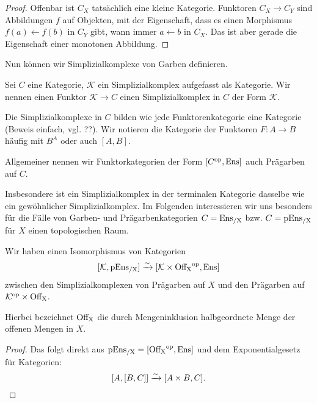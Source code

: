 \begin{proof}
  Offenbar ist $C_X$ tatsächlich eine kleine Kategorie. Funktoren $C_X
  \to C_Y$ sind Abbildungen $f$ auf Objekten, mit der Eigenschaft,
  dass es einen Morphismus $f(a) \leftarrow f(b)$ in $C_Y$ gibt, wann
  immer $a \leftarrow b$ in $C_X$. Das ist aber gerade die Eigenschaft
  einer monotonen Abbildung.
\end{proof}

Nun können wir Simplizialkomplexe von Garben definieren.

\begin{defn}
  Sei $C$ eine Kategorie, $\mathcal{K}$ ein Simplizialkomplex
  aufgefasst als Kategorie. Wir nennen einen Funktor $\mathcal{K} \to
  C$ einen Simplizialkomplex in $C$ der Form $\mathcal{K}$.
\end{defn}

Die Simplizialkomplexe in $C$ bilden wie jede Funktorenkategorie eine
Kategorie (Beweis einfach, vgl. ??). Wir notieren die Kategorie der
Funktoren $F: A \to B$ häufig mit $B^A$ oder auch $[A, B]$.

Allgemeiner nennen wir Funktorkategorien der Form $[C^\mathrm{op}, \operatorname{Ens}]$ auch
Prägarben auf $C$.

Insbesondere ist ein Simplizialkomplex in der terminalen Kategorie
dasselbe wie ein gewöhnlicher Simplizialkomplex. Im Folgenden
interessieren wir uns besonders für die Fälle von Garben- und
Prägarbenkategorien $C = \operatorname{Ens_{/X}}$ bzw. $C = \operatorname{pEns_{/X}}$ für $X$ einen
topologischen Raum.

\begin{lemma}
  Wir haben einen Isomorphismus von Kategorien
  \[
    [\mathcal{K}, \operatorname{pEns_{/X}}] \xrightarrow[]{\sim} {[\mathcal{K} \times \operatorname{Off_X}^\mathrm{op}, \operatorname{Ens}]}
  \]    
  zwischen den Simplizialkomplexen von Prägarben auf $X$ und den
  Prägarben auf $\mathcal{K}^\mathrm{op} \times \operatorname{Off_X}$.
\end{lemma}
Hierbei bezeichnet $\operatorname{Off_X}$ die durch Mengeninklusion halbgeordnete
Menge der offenen Mengen in $X$.
\begin{proof}
  Das folgt direkt aus $\operatorname{pEns_{/X}} = [\operatorname{Off_X}^\mathrm{op}, \operatorname{Ens}]$ und dem
  Exponentialgesetz für Kategorien:
  \[ [A, [B, C]] \xrightarrow[]{\sim} {[A \times B, C]}. \]
\end{proof}

